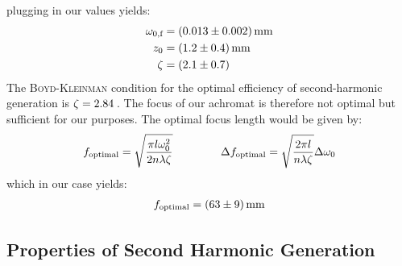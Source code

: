 \documentclass{protokoll_en}
\begin{document}
plugging in our values yields:
\begin{align}
\omega_{0,\textrm{f}} &= \unit[(0.013 \pm 0.002)]{mm} \\
\notag z_0 &= \unit[(1.2 \pm 0.4)]{mm}\\
\notag \zeta &= \unit[(2.1 \pm 0.7)]{}
\end{align}
The \textsc{Boyd-Kleinman} condition for the optimal efficiency of second-harmonic generation is $\zeta = \unit[2.84]{}$. The focus of our achromat is therefore not optimal but sufficient for our purposes. The optimal focus length would be given by:
\begin{align}
f_\textrm{optimal} = \sqrt{\frac{\pi l \omega^2_0}{2n\lambda\zeta}} \hspace{1.5cm} \Delta f_\textrm{optimal} = \sqrt{\frac{2\pi l}{n\lambda\zeta}}\Delta\omega_0
\end{align}
which in our case yields:
\begin{align}
f_\textrm{optimal} = \unit[(63 \pm 9)]{mm}
\end{align}

\subsection{Properties of Second Harmonic Generation}
\label{subsec:ana_props_2ndharmonic}
\end{document}
